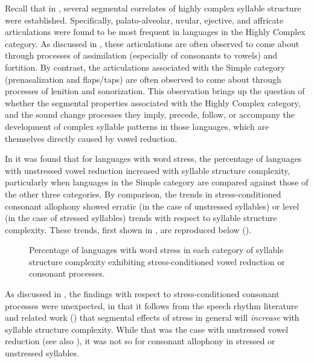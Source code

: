   Recall that in , several segmental correlates of highly complex syllable structure were established. Specifically, palato-alveolar, uvular, ejective, and affricate articulations were found to be most frequent in languages in the Highly Complex category. As discussed in , these articulations are often observed to come about through processes of assimilation (especially of consonants to vowels) and fortition. By contrast, the articulations associated with the Simple category (prenasalization and flaps/taps) are often observed to come about through processes of lenition and sonorization. This observation brings up the question of whether the segmental properties associated with the Highly Complex category, and the sound change processes they imply, precede, follow, or accompany the development of complex syllable patterns in those languages, which are themselves directly caused by vowel reduction.

  In  it was found that for languages with word stress, the percentage of languages with unstressed vowel reduction increased with syllable structure complexity, particularly when languages in the Simple category are compared against those of the other three categories. By comparison, the trends in stress-conditioned consonant allophony showed erratic (in the case of unstressed syllables) or level (in the case of stressed syllables) trends with respect to syllable structure complexity. These trends, first shown in , are reproduced below ().

  
\begin{figure}
\caption{\label{fig:7.1} Percentage of languages with word stress in each category of syllable structure complexity exhibiting stress-conditioned vowel reduction or consonant processes.}
\end{figure}

As discussed in , the findings with respect to stress-conditioned consonant processes were unexpected, in that it follows from the speech rhythm literature and related work (\citealt{BybeeEtAl1998,Schiering2007}) that segmental effects of stress in general will \textit{increase} with syllable structure complexity. While that was the case with unstressed vowel reduction (see also ), it was not so for consonant allophony in stressed or unstressed syllables.

